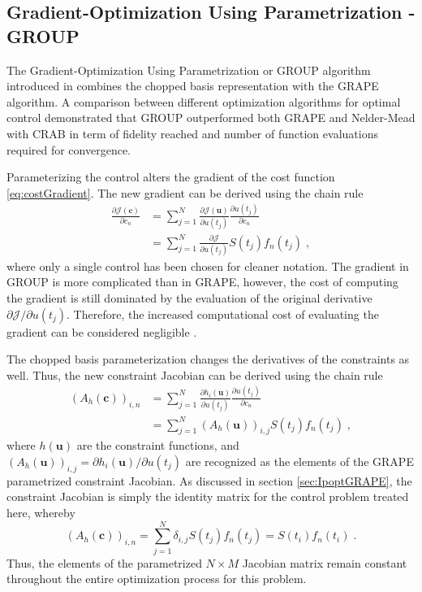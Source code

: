 \subsection{Gradient-Optimization Using Parametrization - GROUP}
The Gradient-Optimization Using Parametrization or \textsc{GROUP} algorithm introduced in \cite{sorensen2018} combines the chopped basis representation with the \textsc{GRAPE} algorithm. A comparison between different optimization algorithms for optimal control demonstrated that \textsc{GROUP} outperformed both \textsc{GRAPE} and Nelder-Mead with \textsc{CRAB} in term of fidelity reached and number of function evaluations required for convergence.

Parameterizing the control alters the gradient of the cost function \eqref{eq:costGradient}. The new gradient can be derived using the chain rule
\begin{align}
	\frac{\partial \mathcal{J} (\boldsymbol{c})}{\partial c_n} &= \sum_{j = 1}^{N} \frac{\partial \mathcal{J} (\boldsymbol{u})}{\partial u(t_j)} \frac{\partial u(t_j)}{\partial c_n} \nonumber \\
	&= \sum_{j = 1}^{N} \frac{\partial \mathcal{J} }{\partial u(t_j)} S(t_j) f_n(t_j) \; , \label{eq:GROUPgradient} 
\end{align}
where only a single control has been chosen for cleaner notation. The gradient in \textsc{GROUP} is more complicated than in \textsc{GRAPE}, however, the cost of computing the gradient is still dominated by the evaluation of the original derivative ${\partial \mathcal{J} }/{\partial u(t_j)}$. Therefore, the increased computational cost of evaluating the gradient can be considered negligible \cite{sorensen2018}.

The chopped basis parameterization changes the derivatives of the constraints as well. Thus, the new constraint Jacobian can be derived using the chain rule
\begin{align}
	(A_h (\boldsymbol{c}))_{i,n}  &= \sum_{j = 1}^{N} \frac{\partial h_i (\boldsymbol{u} ) }{\partial u(t_j)} \frac{\partial u(t_j)}{\partial c_n} \nonumber \\
	&= \sum_{j = 1}^{N} (A_h (\boldsymbol{u}))_{i,j} S(t_j) f_n (t_j) \; , \label{eq:GROUPconstJacobian} 
\end{align}
where $h(\boldsymbol{u})$ are the constraint functions, and $(A_h (\boldsymbol{u}))_{i,j} = {\partial h_i (\boldsymbol{u}) } / {\partial u(t_j)}$ are recognized as the elements of the GRAPE parametrized constraint Jacobian. As discussed in section \ref{sec:IpoptGRAPE}, the constraint Jacobian is simply the identity matrix for the control problem treated here, whereby 
\begin{equation}
	(A_h (\boldsymbol{c}))_{i,n} = \sum_{j = 1}^{N} \delta_{i,j} S(t_j) f_n (t_j) = S(t_i) f_n (t_i) \; .
\end{equation} 
Thus, the elements of the parametrized $N \times M$ Jacobian matrix remain constant throughout the entire optimization process for this problem.

